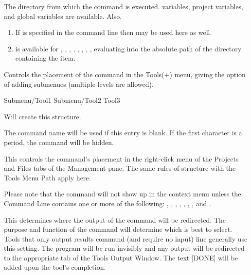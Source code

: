 
The directory from which the command is executed. \codeblocks variables, project variables, and global variables are available. Also, 

\begin{enumerate}
\item If  is specified in the command line then  may be used here as well.
\item {} is available for , , , , , , , , evaluating into the absolute path of the directory containing the item.
\end{enumerate}


Controls the placement of the command in the Tools(+) menu, giving the option of adding submenues (multiple levels are allowed).

\begin{itemize}
Submenu/Tool1 
Submenu/Tool2 
Tool3 
\end{itemize}

Will create this structure.


The command name will be used if this entry is blank. If the first character is a period, the command will be hidden.


This controls the command's placement in the right-click menu of the Projects and Files tabs of the Management pane. The same rules of structure with the Tools Menu Path apply here.


Please note that the command will not show up in the context menu unless the Command Line contains one or more of the following: , , , , , , , and . 


This determines where the output of the command will be redirected. The purpose and function of the command will determine which is best to select.
Tools that only output results command (and require no input) line generally use this setting. The program will be run invisibly and any output will be redirected to the appropriate tab of the Tools Output Window. The text [DONE] will be added upon the tool's completion.

